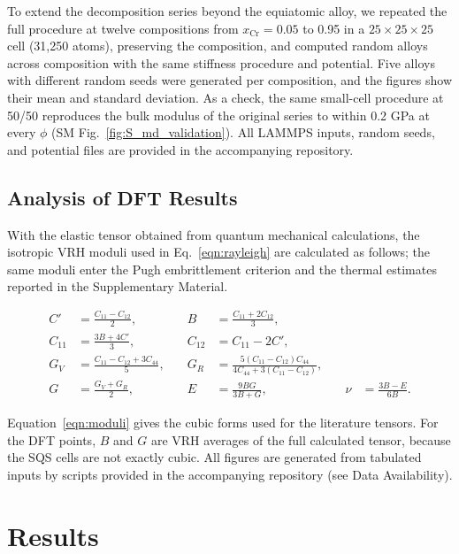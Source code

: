 \documentclass[final,3p,times]{elsarticle}
\begin{document}
To extend the decomposition series beyond the equiatomic alloy, we repeated the full procedure at twelve compositions from $x_{\mathrm{Cr}}=0.05$ to 0.95 in a $25\times25\times25$ cell (31,250 atoms), preserving the composition, and computed random alloys across composition with the same stiffness procedure and potential. Five alloys with different random seeds were generated per composition, and the figures show their mean and standard deviation. As a check, the same small-cell procedure at 50/50 reproduces the bulk modulus of the original series to within 0.2 GPa at every $\phi$ (SM Fig.~\ref{fig:S_md_validation}). All LAMMPS inputs, random seeds, and potential files are provided in the accompanying repository.

\subsection{Analysis of DFT Results}
\label{sec:analysis}
With the elastic tensor obtained from quantum mechanical calculations, the isotropic VRH moduli used in Eq.~\ref{eqn:rayleigh} are calculated as follows; the same moduli enter the Pugh embrittlement criterion and the thermal estimates reported in the Supplementary Material.

\begin{equation}
\begin{aligned}
C' &= \frac{C_{11}-C_{12}}{2},
&\quad
B &= \frac{C_{11}+2C_{12}}{3}, \\
C_{11} &= \frac{3B+4C'}{3},
&\quad
C_{12} &= C_{11}-2C', \\
G_V &= \frac{C_{11}-C_{12}+3C_{44}}{5},
&\quad
G_R &= \frac{5(C_{11}-C_{12})C_{44}}{4C_{44}+3(C_{11}-C_{12})}, \\
G &= \frac{G_V+G_R}{2},
&\quad
E &= \frac{9BG}{3B+G},
&\quad
\nu &= \frac{3B-E}{6B}.
\end{aligned}
\label{eqn:moduli}
\end{equation}

Equation~\ref{eqn:moduli} gives the cubic forms used for the literature tensors. For the DFT points, $B$ and $G$ are VRH averages of the full calculated tensor, because the SQS cells are not exactly cubic. All figures are generated from tabulated inputs by scripts provided in the accompanying repository (see Data Availability).


\section{Results}
\end{document}
